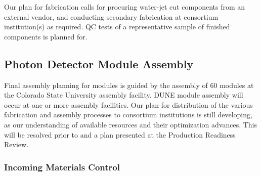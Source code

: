 Our plan for fabrication calls for procuring water-jet cut components from an external vendor, and conducting secondary fabrication at consortium institution(s) as required.  QC tests of a representative sample of finished components is planned for.

\label{sec:fdsp-pd-prod-pc}








\subsection{Photon Detector Module Assembly}

Final assembly planning for  modules is guided by the assembly of \num{60}   modules at the Colorado State University assembly facility. DUNE   module assembly will occur at one or more assembly facilities.  Our plan for distribution of the various fabrication and assembly processes to consortium institutions is still developing, as our understanding of available resources and their optimization advances.  This will be resolved prior to and a plan presented at the Production Readiness Review.

\subsubsection{Incoming Materials Control}

